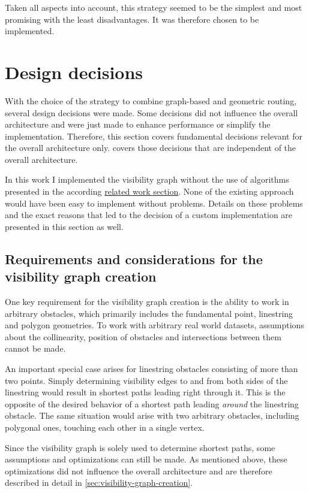 		Taken all aspects into account, this strategy seemed to be the simplest and most promising with the least disadvantages.
		It was therefore chosen to be implemented.

\section{Design decisions}
\label{sec:design-decisions}

	With the choice of the strategy to combine graph-based and geometric routing, several design decisions were made.
	Some decisions did not influence the overall architecture and were just made to enhance performance or simplify the implementation.
	Therefore, this section covers fundamental decisions relevant for the overall architecture only.
	 covers those decisions that are independent of the overall architecture.
	
	In this work I implemented the visibility graph without the use of algorithms presented in the according \hyperref[subsec:related-work:visibility-graph]{related work section}.
	None of the existing approach would have been easy to implement without problems.
	Details on these problems and the exact reasons that led to the decision of a custom implementation are presented in this section as well.
	
	\subsection{Requirements and considerations for the visibility graph creation}
	
		One key requirement for the visibility graph creation is the ability to work in arbitrary obstacles, which primarily includes the fundamental point, linestring and polygon geometries.
		To work with arbitrary real world datasets, assumptions about the collinearity, position of obstacles and intersections between them cannot be made.
		
		An important special case arises for linestring obstacles consisting of more than two points.
		Simply determining visibility edges to and from both sides of the linestring would result in shortest paths leading right through it.
		This is the opposite of the desired behavior of a shortest path leading \emph{around} the linestring obstacle.
		The same situation would arise with two arbitrary obstacles, including polygonal ones, touching each other in a single vertex.
		
		Since the visibility graph is solely used to determine shortest paths, some assumptions and optimizations can still be made.
		As mentioned above, these optimizations did not influence the overall architecture and are therefore described in detail in \cref{sec:visibility-graph-creation}.
		
